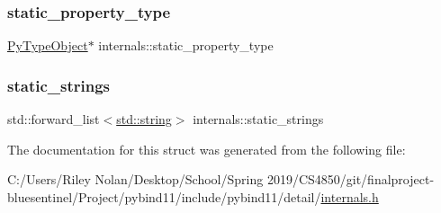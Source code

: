 \mbox{\label{structinternals_a6115d4d47cb0cf54c97b9f2b772054c8}} 
\subsubsection{\texorpdfstring{static\_property\_type}{static\_property\_type}}
{\footnotesize\ttfamily \mbox{\hyperlink{_python27_2object_8h_a42a55dd6e973872c7a6bc61632070f6f}{Py\+Type\+Object}}$\ast$ internals\+::static\+\_\+property\+\_\+type}

\mbox{\label{structinternals_ad322abbf9d8c4915221324444ab33192}} 
\subsubsection{\texorpdfstring{static\_strings}{static\_strings}}
{\footnotesize\ttfamily std\+::forward\+\_\+list$<$\mbox{\hyperlink{_s_d_l__opengl__glext_8h_ab4ccfaa8ab0e1afaae94dc96ef52dde1}{std\+::string}}$>$ internals\+::static\+\_\+strings}



The documentation for this struct was generated from the following file\+:\begin{DoxyCompactItemize}
\item 
C\+:/\+Users/\+Riley Nolan/\+Desktop/\+School/\+Spring 2019/\+C\+S4850/git/finalproject-\/bluesentinel/\+Project/pybind11/include/pybind11/detail/\mbox{\hyperlink{internals_8h}{internals.\+h}}\end{DoxyCompactItemize}
